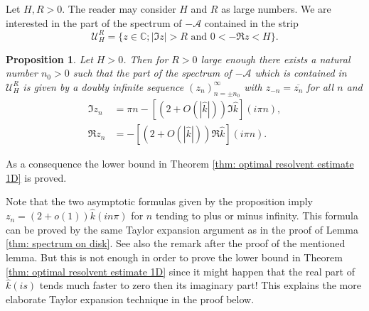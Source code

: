 \documentclass{amsart}
\newcommand{\abs}[1]{\left|#1\right|}
\newcommand{\A}{\mathcal{A}}
\newcommand{\Ueps}{{\mathcal{U}_H^R}}
\newcommand{\khat}{\hat{k}}
\newcommand{\C}{\mathbb{C}}
\newtheorem{Proposition}[Theorem]{Proposition}
\begin{document}
Let $H,R>0$. The reader may consider $H$ and $R$ as large numbers. We are interested in the part of the spectrum of $-\A$ contained in the strip
\begin{equation}\nonumber
 \Ueps = \{z\in\C; \abs{\Im z}>R \text{ and } 0 < -\Re z < H\} .
\end{equation}
\begin{Proposition}\label{thm: spectrum 1D}
 Let $H>0$. Then for $R>0$ large enough there exists a natural number $n_0>0$ such that the part of the spectrum of $-\A$ which is contained in $\Ueps$ is given by a doubly infinite sequence $(z_n)_{n=\pm n_0}^{\infty}$ with $z_{-n}=\overline{z_n}$ for all $n$ and
 \begin{align*}
  \Im z_n &= \pi n - \left[(2+O(|\khat|))\Im\khat\right](i\pi n), \\
  \Re z_n &= -\left[(2+O(|\khat|))\Re\khat\right](i\pi n).
 \end{align*}
\end{Proposition}
As a consequence the lower bound in Theorem \ref{thm: optimal resolvent estimate 1D} is proved.

Note that the two asymptotic formulas given by the proposition imply $z_n=(2+o(1))\khat(in\pi)$ for $n$ tending to plus or minus infinity. This formula can be proved by the same Taylor expansion argument as in the proof of Lemma \ref{thm: spectrum on disk}. See also the remark after the proof of the mentioned lemma. But this is not enough in order to prove the lower bound in Theorem \ref{thm: optimal resolvent estimate 1D} since it might happen that the real part of $\khat(is)$ tends much faster to zero then its imaginary part! This explains the more elaborate Taylor expansion technique in the proof below.
\end{document}
